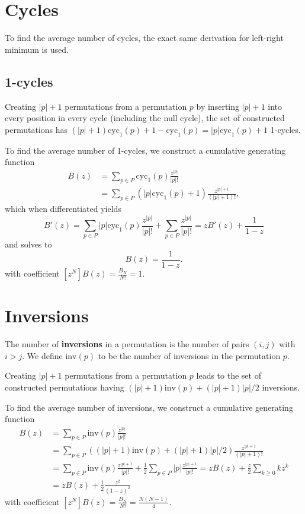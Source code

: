 \documentclass{article}
\begin{document}
\section{Cycles}

To find the average number of cycles, the exact same derivation for left-right
minimum is used.

\subsection{1-cycles}

Creating $|p| + 1$ permutations from a permutation $p$ by inserting $|p| + 1$
into every position in every cycle (including the null cycle), the set of
constructed permutations has $(|p| + 1)\mathrm{cyc}_1(p) + 1 -
\mathrm{cyc}_1(p) = |p|\mathrm{cyc}_1(p) + 1$ 1-cycles.

To find the average number of 1-cycles, we construct a cumulative generating
function \begin{align*}
  B(z) &= \sum_{p \in P} \mathrm{cyc}_1(p)\frac{z^{|p|}}{|p|!} \\
       &= \sum_{p \in P} (|p|\mathrm{cyc}_1(p) + 1)
       \frac{z^{|p| + 1}}{(|p| + 1)!},
\end{align*} which when differentiated yields \begin{equation*}
  B'(z) = \sum_{p \in P} |p|\mathrm{cyc}_1(p)\frac{z^{|p|}}{|p|!} +
  \sum_{p \in P} \frac{z^{|p|}}{|p|!} = zB'(z) + \frac{1}{1 - z}
\end{equation*} and solves to \begin{equation*}
  B(z) = \frac{1}{1 - z}.
\end{equation*} with coefficient $[z^N]B(z) = \frac{B_N}{N!} = 1$.

\section{Inversions}

The number of \textbf{inversions} in a permutation is the number of pairs $(i,
j)$ with $i > j$. We define $\mathrm{inv}(p)$ to be the number of inversions in
the permutation $p$.

Creating $|p| + 1$ permutations from a permutation $p$ leads to the set of
constructed permutations having $(|p| + 1)\mathrm{inv}(p) + (|p| + 1)|p|/2$
inversions.

To find the average number of inversions, we construct a cumulative generating
function \begin{align*}
  B(z) &= \sum_{p \in P} \mathrm{inv}(p)\frac{z^{|p|}}{|p|!} \\
       &= \sum_{p \in P} ((|p| + 1)\mathrm{inv}(p) + (|p| + 1)|p|/2)
       \frac{z^{|p| + 1}}{(|p| + 1)!} \\
       &= \sum_{p \in P} \mathrm{inv}(p)\frac{z^{|p| + 1}}{|p|!} +
       \frac{1}{2}\sum_{p \in P} |p|\frac{z^{|p| + 1}}{|p|!} = zB(z) +
       \frac{z}{2}\sum_{k \geq 0} kz^k \\
       &= zB(z) + \frac{1}{2}\frac{z^2}{(1 - z)^2}
\end{align*} with coefficient $[z^N]B(z) = \frac{B_N}{N!} =
\frac{N(N - 1)}{4}$.
\end{document}
